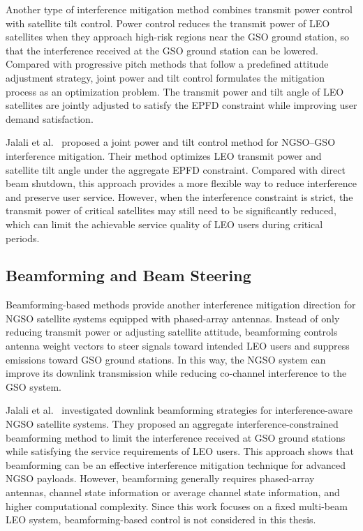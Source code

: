 Another type of interference mitigation method combines transmit power control with satellite tilt control. Power control reduces the transmit power of LEO satellites when they approach high-risk regions near the GSO ground station, so that the interference received at the GSO ground station can be lowered. Compared with progressive pitch methods that follow a predefined attitude adjustment strategy, joint power and tilt control formulates the mitigation process as an optimization problem. The transmit power and tilt angle of LEO satellites are jointly adjusted to satisfy the EPFD constraint while improving user demand satisfaction.

Jalali et al.~\cite{jalali2023joint} proposed a joint power and tilt control method for NGSO--GSO interference mitigation. Their method optimizes LEO transmit power and satellite tilt angle under the aggregate EPFD constraint. Compared with direct beam shutdown, this approach provides a more flexible way to reduce interference and preserve user service. However, when the interference constraint is strict, the transmit power of critical satellites may still need to be significantly reduced, which can limit the achievable service quality of LEO users during critical periods.

\subsection{Beamforming and Beam Steering}
\label{subsec:beamforming}

Beamforming-based methods provide another interference mitigation direction for NGSO satellite systems equipped with phased-array antennas. Instead of only reducing transmit power or adjusting satellite attitude, beamforming controls antenna weight vectors to steer signals toward intended LEO users and suppress emissions toward GSO ground stations. In this way, the NGSO system can improve its downlink transmission while reducing co-channel interference to the GSO system.

Jalali et al.~\cite{jalali2024beamforming} investigated downlink beamforming strategies for interference-aware NGSO satellite systems. They proposed an aggregate interference-constrained beamforming method to limit the interference received at GSO ground stations while satisfying the service requirements of LEO users. This approach shows that beamforming can be an effective interference mitigation technique for advanced NGSO payloads. However, beamforming generally requires phased-array antennas, channel state information or average channel state information, and higher computational complexity. Since this work focuses on a fixed multi-beam LEO system, beamforming-based control is not considered in this thesis.

